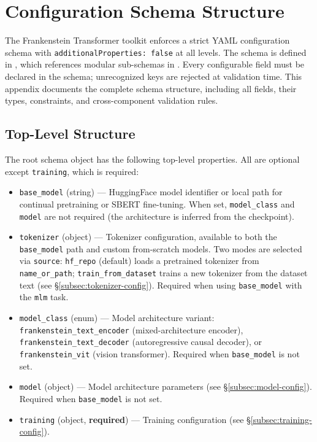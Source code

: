 \section{Configuration Schema Structure}
\label{sec:annex-schema}

The Frankenstein Transformer toolkit enforces a strict YAML configuration schema with \texttt{additionalProperties: false} at all levels. The schema is defined in , which references modular sub-schemas in . Every configurable field must be declared in the schema; unrecognized keys are rejected at validation time. This appendix documents the complete schema structure, including all fields, their types, constraints, and cross-component validation rules.

\subsection{Top-Level Structure}

The root schema object has the following top-level properties. All are optional except \texttt{training}, which is required:

\begin{itemize}[nosep]
    \item \texttt{base\_model} (string) --- HuggingFace model identifier or local path for continual pretraining or SBERT fine-tuning. When set, \texttt{model\_class} and \texttt{model} are not required (the architecture is inferred from the checkpoint).
    \item \texttt{tokenizer} (object) --- Tokenizer configuration, available to both the \texttt{base\_model} path and custom from-scratch models. Two modes are selected via \texttt{source}: \texttt{hf\_repo} (default) loads a pretrained tokenizer from \texttt{name\_or\_path}; \texttt{train\_from\_dataset} trains a new tokenizer from the dataset text (see \S\ref{subsec:tokenizer-config}). Required when using \texttt{base\_model} with the \texttt{mlm} task.
    \item \texttt{model\_class} (enum) --- Model architecture variant: \texttt{frankenstein\_text\_encoder} (mixed-architecture encoder), \texttt{frankenstein\_text\_decoder} (autoregressive causal decoder), or \texttt{frankenstein\_vit} (vision transformer). Required when \texttt{base\_model} is not set.
    \item \texttt{model} (object) --- Model architecture parameters (see \S\ref{subsec:model-config}). Required when \texttt{base\_model} is not set.
    \item \texttt{training} (object, \textbf{required}) --- Training configuration (see \S\ref{subsec:training-config}).
\end{itemize}


